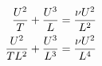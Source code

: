 \begin{subequations}
\begin{align}
	 \addtocounter{equation}{+1}
	 \addtocounter{equation}{+1}
	 \addtocounter{equation}{+1}
	 \addtocounter{equation}{+1}
\frac{U^{2}}{T}
+
\frac{U^{3}}{L}
&=
	 \frac{\nu U^{2}}{L^{2}}\\
\frac{U^{2}}{TL^{2}}
+
\frac{U^{3}}{L^{3}}
&=
	 \frac{\nu U^{2}}{L^{4}}
\end{align}
\end{subequations}

